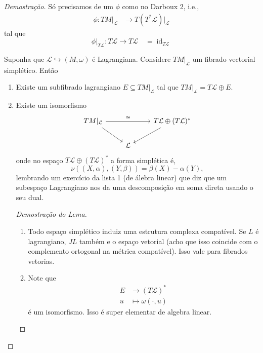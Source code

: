 \begin{proof}[Demostra\c c\~ao]
	S\'o precisamos de um $\phi$ como no Darboux 2, i.e.,
	\begin{align*}
		\phi: TM|_{\mathcal{L}} &\longrightarrow T(T^*\mathcal{L})|_{\mathcal{L}}
	\end{align*}
	tal que
\[\phi|_{T\mathcal{L}}:T\mathcal{L}\to T\mathcal{L}\quad =\operatorname{id}_{T\mathcal{L}}\]

\begin{lemma}
	Suponha que $\mathcal{L}\hookrightarrow (M,\omega)$ \'e Lagrangiana. Considere $TM|_{\mathcal{L}}$ um fibrado vectorial simpl\'etico. Ent\~ao
	\begin{enumerate}
		\item Existe um subfibrado lagrangiano $E\subseteq TM|_{\mathcal{L}}$ tal que $TM|_{\mathcal{L}}=T\mathcal{L}\oplus E$.

		\item Existe um isomorfismo
			\[\begin{tikzcd}
			TM|_{\mathcal{L}}\arrow[rr,"\cong "]\arrow[dr,swap]&&T\mathcal{L}\oplus (T\mathcal{L})^*\arrow[dl]\\
			&\mathcal{L}
			\end{tikzcd}\]
			onde no espaço $T\mathcal{L}\oplus (T\mathcal{L})^*$ a forma simplética \'e,
			\[\nu((X,\alpha),(Y,\beta))=\beta(X)-\alpha(Y),\]
			lembrando um exerc\'icio da lista 1 (de \'alebra linear) que diz que um subespaço Lagrangiano nos da uma descomposi\c c\~ao em soma direta usando o seu dual.

			\begin{proof}[Demostra\c c\~ao do Lema]\leavevmode 

				\begin{enumerate}[label=\textbf{Step \arabic*}]
					\item Todo espaço simpl\'etico induiz uma estrutura complexa compat\'ivel.  Se $L$ \'e lagrangiano, $JL$ tamb\'em e o espaço vetorial (acho que isso coincide com o complemento ortogonal na m\'etrica compat\'ivel). Isso vale para fibrados vetorias.

					\item Note que 
						\begin{align*}
							E &\longrightarrow (T\mathcal{L})^* \\
							u &\longmapsto \omega(\cdot ,u)
						\end{align*}
						\'e um isomorfismo. Isso \'e super elementar de algebra linear.


\end{enumerate}
\end{proof}
\end{enumerate}
\end{lemma}
\end{proof}
